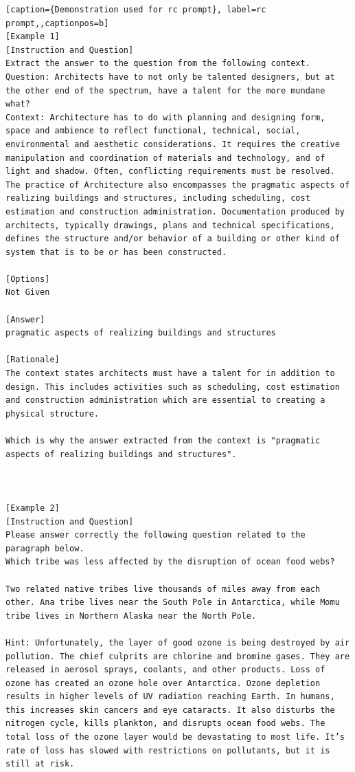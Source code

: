\begin{lstlisting}[caption={Demonstration used for rc prompt}, label=rc prompt,,captionpos=b]
[Example 1]
[Instruction and Question]
Extract the answer to the question from the following context.
Question: Architects have to not only be talented designers, but at the other end of the spectrum, have a talent for the more mundane what?
Context: Architecture has to do with planning and designing form, space and ambience to reflect functional, technical, social, environmental and aesthetic considerations. It requires the creative manipulation and coordination of materials and technology, and of light and shadow. Often, conflicting requirements must be resolved. The practice of Architecture also encompasses the pragmatic aspects of realizing buildings and structures, including scheduling, cost estimation and construction administration. Documentation produced by architects, typically drawings, plans and technical specifications, defines the structure and/or behavior of a building or other kind of system that is to be or has been constructed.

[Options]
Not Given

[Answer]
pragmatic aspects of realizing buildings and structures

[Rationale]
The context states architects must have a talent for in addition to design. This includes activities such as scheduling, cost estimation and construction administration which are essential to creating a physical structure. 

Which is why the answer extracted from the context is "pragmatic aspects of realizing buildings and structures".



[Example 2]
[Instruction and Question]
Please answer correctly the following question related to the paragraph below. 
Which tribe was less affected by the disruption of ocean food webs?

Two related native tribes live thousands of miles away from each other. Ana tribe lives near the South Pole in Antarctica, while Momu tribe lives in Northern Alaska near the North Pole.

Hint: Unfortunately, the layer of good ozone is being destroyed by air pollution. The chief culprits are chlorine and bromine gases. They are released in aerosol sprays, coolants, and other products. Loss of ozone has created an ozone hole over Antarctica. Ozone depletion results in higher levels of UV radiation reaching Earth. In humans, this increases skin cancers and eye cataracts. It also disturbs the nitrogen cycle, kills plankton, and disrupts ocean food webs. The total loss of the ozone layer would be devastating to most life. It’s rate of loss has slowed with restrictions on pollutants, but it is still at risk.


\end{lstlisting}
